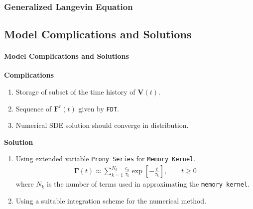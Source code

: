 \documentclass[a4paper,10pt]{beamer}
\newcommand{\BS}[1]{\boldsymbol{#1}}
\newcommand{\sqb}[1]{\left[ #1 \right]}
\begin{document}
	\begin{frame}
		\frametitle{Generalized Langevin Equation}
		\subsection{Model Complications and Solutions}
		\framesubtitle{Model Complications and Solutions}
		\vspace{-0.8cm}
		\begin{minipage}[t]{0.44\textwidth}
			\begin{alertblock}{\textbf{Complications}}
				\begin{enumerate}
					\item {Storage of subset of the time history of $\BS{V}(t)$.}
					\item {Sequence of $\BS{F}^{r}(t)$ given by \texttt{FDT}.}
					\item {Numerical SDE solution should converge in distribution.}
				\end{enumerate}
			\end{alertblock}
		\end{minipage}
		\hfill
		\begin{minipage}[t]{0.52\textwidth}
			\centering
			\begin{exampleblock}{\textbf{Solution}}
				\begin{enumerate}
					\item {Using extended variable \texttt{Prony Series} for \texttt{Memory Kernel}.
					\scriptsize
					\begin{align}
					 \BS{\Gamma}(t) \approx \sum_{k=1}^{N_{k}} \frac{c_{k}}{\tau_{k}} \exp \sqb{-\frac{t}{\tau_{k}}}, \qquad t \geq 0 \end{align}
					\normalsize
					where $N_{k}$ is the number of terms used in approximating the \texttt{memory kernel}. }
					\item {Using a suitable integration scheme for the numerical method.}
				\end{enumerate}
			\end{exampleblock}
		\end{minipage}
	\end{frame}
\end{document}
